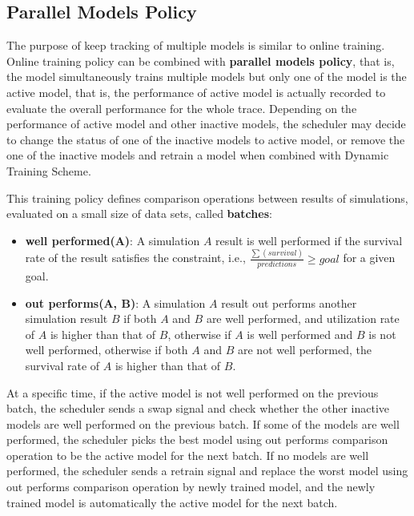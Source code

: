 \documentclass{article}
\begin{document}
\subsection{Parallel Models Policy}

\begin{flushleft}
The purpose of keep tracking of multiple models is similar to online training. Online training policy can be combined with \textbf{parallel models policy}, that is, the model simultaneously trains multiple models but only one of the model is the active model, that is, the performance of active model is actually recorded to evaluate the overall performance for the whole trace. Depending on the performance of active model and other inactive models, the scheduler may decide to change the status of one of the inactive models to active model, or remove the one of the inactive models and retrain a model when combined with Dynamic Training Scheme.

This training policy defines comparison operations between results of simulations, evaluated on a small size of data sets, called \textbf{batches}:

\begin{itemize}
    \item \textbf{well performed(A)}: A simulation $A$ result is well performed if the survival rate of the result satisfies the constraint, i.e., $\frac{\sum(survival)}{predictions} \geq goal$ for a given goal.
    \item \textbf{out performs(A, B)}: A simulation $A$ result out performs another simulation result $B$ if both $A$ and $B$ are well performed, and utilization rate of $A$ is higher than that of $B$, otherwise if $A$ is well performed and $B$ is not well performed, otherwise if both $A$ and $B$ are not well performed, the survival rate of $A$ is higher than that of $B$.
\end{itemize}

At a specific time, if the active model is not well performed on the previous batch, the scheduler sends a swap signal and check whether the other inactive models are well performed on the previous batch. If some of the models are well performed, the scheduler picks the best model using out performs comparison operation to be the active model for the next batch. If no models are well performed, the scheduler sends a retrain signal and replace the worst model using out performs comparison operation by newly trained model, and the newly trained model is automatically the active model for the next batch.


\end{flushleft}
\end{document}
